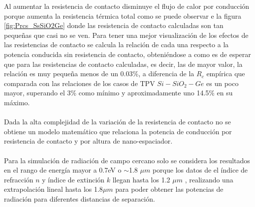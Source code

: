 Al aumentar la resistencia de contacto disminuye el flujo de calor por conducción porque aumenta la resistencia térmica total como se puede observar e la figura \ref{fig:Prcs_SsSiO2Ge} donde las resistencia de contacto calculadas son tan pequeñas que casi no se ven. Para tener una mejor visualización de los efectos de las resistencias de contacto se calcula la relación de cada una respecto a la potencia conducida sin resistencia de contacto, obteniéndose a como es de esperar que para las resistencias de contacto calculadas, es decir, las de mayor valor, la relación es muy pequeña menos de un 0.03\%, a diferencia de la $R_c$ empírica que comparada con las relaciones de los casos de TPV $Si-SiO_2-Ge$ es un poco mayor, superando el 3\% como mínimo y aproximadamente uno 14.5\% en su máximo.\\\\
Dada la alta complejidad de la variación de la resistencia de contacto no se obtiene un modelo matemático que relaciona la potencia de conducción por resistencia de contacto y por altura de nano-espaciador.\\\\
Para la simulación de radiación de campo cercano solo se considera los resultados en el rango de energía mayor a 0.7eV o $\sim$1.8 $\mu m$ porque los datos de el índice de refracción $n$ y índice de extinción $k$ llegan hasta los 1.2 $\mu m$ \cite{ss_optical_2017}, realizando una extrapolación lineal hasta los 1.8$\mu m$ para poder obtener las potencias de radiación para diferentes distancias de separación.
